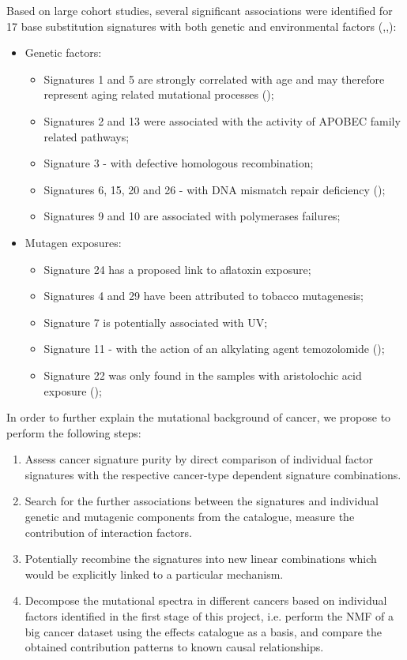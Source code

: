 Based on large cohort studies, several significant associations were identified for 
17 base substitution signatures with both genetic and environmental factors (\cite{Alexandrov2013-md},\cite{Alexandrov2015-clock},\cite{Roberts2014-nl}):

\begin{itemize}
\itemsep0em
\item Genetic factors:
  \begin{itemize}
  \itemsep0em
  \item Signatures 1 and 5 are strongly correlated with age and may therefore represent aging related mutational processes (\cite{Alexandrov2015-clock});
  \item Signatures 2 and 13 were associated with the activity of APOBEC family related pathways;
  \item Signature 3 - with defective homologous recombination;
  \item Signatures 6, 15, 20 and 26 - with DNA mismatch repair deficiency (\cite{Supek2015-pr});
  \item Signatures 9 and 10 are associated with polymerases failures;
  \end{itemize}
\item Mutagen exposures:
  \begin{itemize}
  \itemsep0em
  \item Signature 24 has a proposed link to aflatoxin exposure;
  \item Signatures 4 and 29 have been attributed to tobacco mutagenesis;
  \item Signature 7 is potentially associated with UV;
  \item Signature 11 - with the action of an alkylating agent temozolomide (\cite{Poon2014-review});
  \item Signature 22 was only found in the samples with aristolochic acid exposure (\cite{Poon2015-AA});
  \end{itemize}
\end{itemize}

In order to further explain the mutational background of cancer, we propose to perform the following steps:

\begin{enumerate}
\item Assess cancer signature purity by direct comparison of individual factor signatures with the respective cancer-type dependent signature combinations.
\item Search for the further associations between the signatures and individual genetic and mutagenic components from the catalogue, measure the contribution of interaction factors.
\item Potentially recombine the signatures into new linear combinations which would be explicitly linked to a particular mechanism.
\item Decompose the mutational spectra in different cancers based on individual factors identified in the first stage of this project, i.e. perform the NMF of a big cancer dataset using the effects catalogue as a basis, and compare the obtained contribution patterns to known causal relationships.
\end{enumerate}

